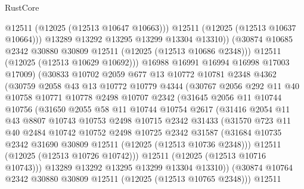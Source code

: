 \begin{lexlean}{RustCore}
\begin{coremodule}
                      @12511
                      (@12025 (@12513 @10647 @10663)))
                    @12511
                    (@12025 (@12513 @10637 @10664)))
                  @13289
                  @13292
                  @13295
                  @13299
                  @13304
                  @13310))
              (@30874 @10685 @2342 @30880 @30809 @12511 (@12025 (@12513 @10686 @2348)))
              @12511
              (@12025 (@12513 @10629 @10692)))
            @16988
            @16991
            @16994
            @16998
            @17003
            @17009)
          (@30833
            @10702
            @2059
            @677
            @13
            @10772
            @10781
            @2348
            @4362
            (@30759
              @2058
              @43
              @13
              @10772
              @10779
              @4344
              (@30767
                @2056
                @292
                @11
                @40
                @10758
                @10771
                @10778
                @2498
                @10707
                @2342
                (@31645
                  @2056
                  @11
                  @10744
                  @10756
                  (@31650
                    @2055
                    @58
                    @11
                    @10744
                    @10754
                    @2617
                    (@31416
                      @2054
                      @11
                      @43
                      @8807
                      @10743
                      @10753
                      @2498
                      @10715
                      @2342
                      @31433
                      (@31570
                        @723
                        @11
                        @40
                        @2484
                        @10742
                        @10752
                        @2498
                        @10725
                        @2342
                        @31587
                        (@31684 @10735 @2342 @31690 @30809 @12511 (@12025 (@12513 @10736 @2348)))
                        @12511
                        (@12025 (@12513 @10726 @10742)))
                      @12511
                      (@12025 (@12513 @10716 @10743)))
                    @13289
                    @13292
                    @13295
                    @13299
                    @13304
                    @13310))
                (@30874 @10764 @2342 @30880 @30809 @12511 (@12025 (@12513 @10765 @2348)))
                @12511

\end{coremodule}
\end{lexlean}
